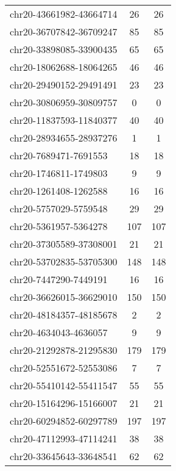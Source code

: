 \documentclass[10pt,letterpaper]{article}
\begin{document}
{\begin{longtable}{lSS}
	chr20-43661982-43664714 & 26     & 26                    \\
	chr20-36707842-36709247 & 85     & 85                    \\
	chr20-33898085-33900435 & 65     & 65                    \\
	chr20-18062688-18064265 & 46     & 46                    \\
	chr20-29490152-29491491 & 23     & 23                    \\
	chr20-30806959-30809757 & 0      & 0                     \\
	chr20-11837593-11840377 & 40     & 40                    \\
	chr20-28934655-28937276 & 1      & 1                     \\
	chr20-7689471-7691553   & 18     & 18                    \\
	chr20-1746811-1749803   & 9      & 9                     \\
	chr20-1261408-1262588   & 16     & 16                    \\
	chr20-5757029-5759548   & 29     & 29                    \\
	chr20-5361957-5364278   & 107    & 107                   \\
	chr20-37305589-37308001 & 21     & 21                    \\
	chr20-53702835-53705300 & 148    & 148                   \\
	chr20-7447290-7449191   & 16     & 16                    \\
	chr20-36626015-36629010 & 150    & 150                   \\
	chr20-48184357-48185678 & 2      & 2                     \\
	chr20-4634043-4636057   & 9      & 9                     \\
	chr20-21292878-21295830 & 179    & 179                   \\
	chr20-52551672-52553086 & 7      & 7                     \\
	chr20-55410142-55411547 & 55     & 55                    \\
	chr20-15164296-15166007 & 21     & 21                    \\
	chr20-60294852-60297789 & 197    & 197                   \\
	chr20-47112993-47114241 & 38     & 38                    \\
	chr20-33645643-33648541 & 62     & 62                    \\

\end{longtable}}
\end{document}
